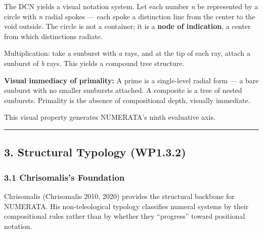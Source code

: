 \documentclass[
]{article}
\begin{document}
The DCN yields a visual notation system. Let each number \emph{n} be
represented by a circle with \emph{n} radial spokes --- each spoke a
distinction line from the center to the void outside. The circle is not
a container; it is a \textbf{node of indication}, a center from which
distinctions radiate.

Multiplication: take a sunburst with \emph{a} rays, and at the tip of
each ray, attach a sunburst of \emph{b} rays. This yields a compound
tree structure.

\textbf{Visual immediacy of primality:} A prime is a single-level radial
form --- a bare sunburst with no smaller sunbursts attached. A composite
is a tree of nested sunbursts. Primality is the absence of compositional
depth, visually immediate.

This visual property generates NUMERATA's ninth evaluative axis.

\begin{center}\rule{0.5\linewidth}{0.5pt}\end{center}

\subsection{3. Structural Typology
(WP1.3.2)}\label{structural-typology-wp1.3.2}

\subsubsection{3.1 Chrisomalis's
Foundation}\label{chrisomaliss-foundation}

Chrisomalis (Chrisomalis 2010, 2020) provides the structural backbone
for NUMERATA. His non-teleological typology classifies numeral systems
by their compositional rules rather than by whether they ``progress''
toward positional notation.
\end{document}

